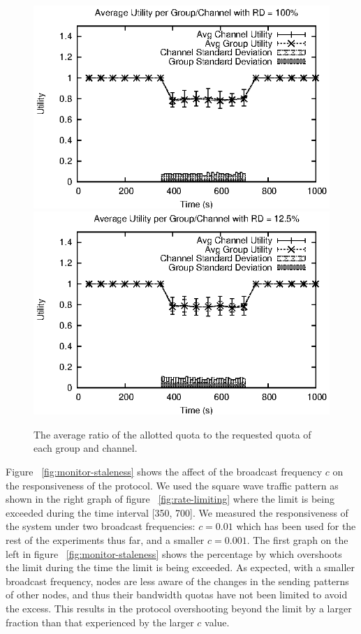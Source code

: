 \begin{figure}[t]
 \centering
 \includegraphics[scale=1]{figures/evaluation/fairness/utility-rd1.eps}
 \includegraphics[scale=1]{figures/evaluation/fairness/utility-rd.125.eps}
 \caption{The average ratio of the allotted quota to the requested quota of each group and channel.}
 \label{fig:utility}
\end{figure}

Figure ~\ref{fig:monitor-staleness} shows the affect of the broadcast frequency $c$ on the responsiveness of the protocol. We used the square wave traffic pattern as shown in the right graph of figure ~\ref{fig:rate-limiting} where the limit is being exceeded during the time interval [350, 700]. We measured the responsiveness of the system under two broadcast frequencies: $c=0.01$ which has been used for the rest of the experiments thus far, and a smaller $c=0.001$. The first graph on the left in figure ~\ref{fig:monitor-staleness} shows the percentage by which \sysname{} overshoots the limit during the time the limit is being exceeded. As expected, with a smaller broadcast frequency, nodes are less aware of the changes in the sending patterns of other nodes, and thus their bandwidth quotas have not been limited to avoid the excess. This results in the protocol overshooting beyond the limit by a larger fraction than that experienced by the larger $c$ value.

